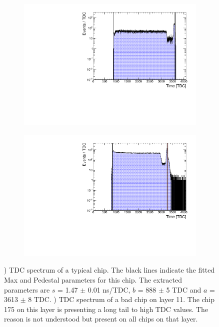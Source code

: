 \begin{figure}[htbp!]
	\begin{subfigure}[t]{0.5\textwidth}
		\centering
		\includegraphics[width=1\linewidth]{../Thesis_Plots/Timing/Muons/Plots/ExampleTDCSpectra.pdf}
		\caption{} \label{fig:TDC_Spectrum}
	\end{subfigure}
	\hfill
	\begin{subfigure}[t]{0.5\textwidth}
		\centering
		\includegraphics[width=1\linewidth]{../Thesis_Plots/Timing/Muons/Plots/BadTDCSpectra_Layer11.pdf}
		\caption{} \label{fig:TDC_Spectrum_bad}
	\end{subfigure}
	\caption{) TDC spectrum of a typical chip. The black lines indicate the fitted Max and Pedestal parameters for this chip. The extracted parameters are $s$ = 1.47 $\pm$ 0.01 ns/TDC, $b$ = 888 $\pm$ 5 TDC and $a$ = 3613 $\pm$ 8 TDC. ) TDC spectrum of a bad chip on layer 11. The chip 175 on this layer is presenting a long tail to high TDC values. The reason is not understood but present on all chips on that layer.}
\end{figure}

